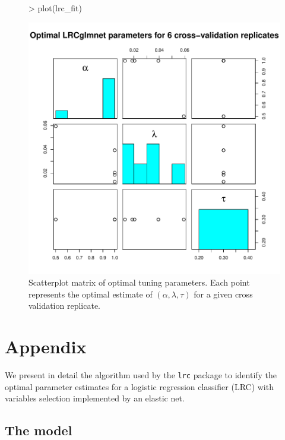 \documentclass{article}
\begin{document}
\begin{figure}[H]
\begin{center}
\begin{Schunk}
\begin{Sinput}
> plot(lrc_fit)
\end{Sinput}
\end{Schunk}
\includegraphics{lrc-plot}
\caption{Scatterplot matrix of optimal tuning parameters.  Each point represents the optimal estimate of $(\alpha,\lambda,\tau)$
for a given cross validation replicate.}
\end{center}
\end{figure}

\nocite{*}

  

\newpage

\section{Appendix}
We present in detail the algorithm used by the {\tt lrc} package to identify the optimal parameter estimates
for a logistic regression classifier (LRC) with variables selection implemented by an elastic net.  

\subsection{The model}
\end{document}
